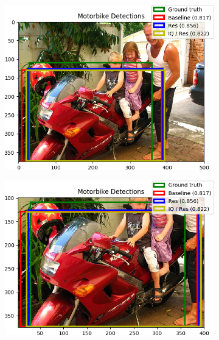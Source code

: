 \begin{figure}[H]
    \centering
    \begin{subfigure}[b]{0.45\textwidth}
        \center
        \includegraphics[width=\textwidth]{Figs/Results/000058res.png}
        \caption{}\label{fig:}
    \end{subfigure}
    \begin{subfigure}[b]{0.45\textwidth}
        \center
        \includegraphics[width=\textwidth]{Figs/Results/000058reszoom.png}
        \caption{}\label{fig:}
    \end{subfigure}
    \caption{}
    \label{fig:}
\end{figure} 

